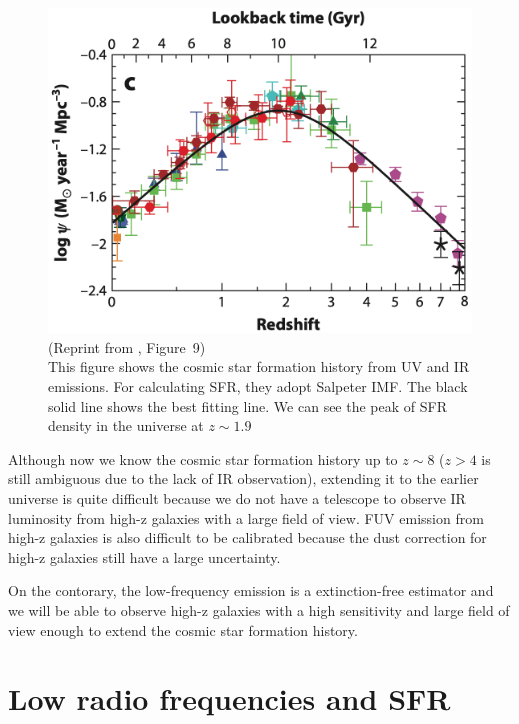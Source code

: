 \begin{figure}[htbp]
	\centering
	\includegraphics[width=.7\linewidth]{Chapter_1/Figures/Madau2014_Figure9.png}
    \caption[Reprint from \citet{Madau2014} (Figure~9)]{\label{fig:Madau2014_figure9}
        (Reprint from \citet{Madau2014}, Figure~9)\\
        This figure shows the cosmic star formation history from UV and IR emissions.
        For calculating SFR, they adopt Salpeter IMF\@.
        The black solid line shows the best fitting line.
        We can see the peak of SFR density in the universe at $z\sim1.9$
    }
\end{figure}

Although now we know the cosmic star formation history up to $z\sim8$ ($z > 4$ is still ambiguous due to the lack of IR observation), extending it to the earlier universe is quite difficult because we do not have a telescope to observe IR luminosity from high-z galaxies with a large field of view.
FUV emission from high-z galaxies is also difficult to be calibrated because the dust correction for high-z galaxies still have a large uncertainty.

On the contorary, the low-frequency emission is a extinction-free estimator and we will be able to observe high-z galaxies with a high sensitivity and large field of view enough to extend the cosmic star formation history.





\section{Low radio frequencies and SFR}\label{sec:lowradiofrequenciesandsfr}

